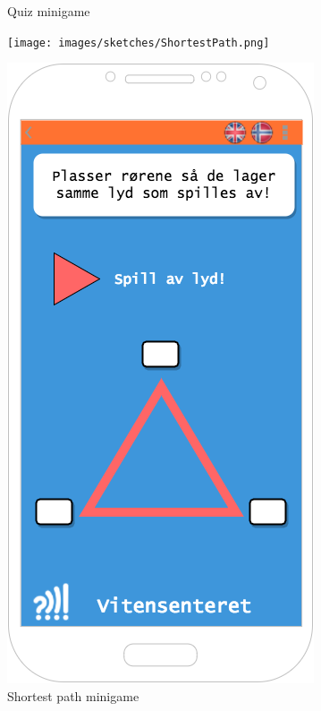 \begin{figure}[H]
\begin{minipage}[b]{0.35\textwidth}
    \caption{Quiz minigame}
  \end{minipage}
  \hfill
  \begin{minipage}[b]{0.35\textwidth}
    \texttt{[image: images/sketches/ShortestPath.png]}
    \caption{Shortest path minigame}
  \end{minipage}
  \begin{minipage}[b]{0.35\textwidth}
    \includegraphics[width=\textwidth]{images/sketches/SoundGaem.png}

\end{minipage}
\end{figure}
